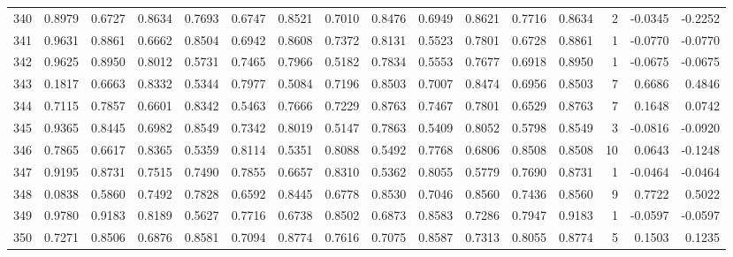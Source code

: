 \begin{tabular}{lrrrrrrrrrrrrrrr}
340 &      0.8979 &  0.6727 &  0.8634 &  0.7693 &  0.6747 &  0.8521 &  0.7010 &  0.8476 &  0.6949 &  0.8621 &   0.7716 &     0.8634 &      2 &                   -0.0345 &                    -0.2252 \\
341 &      0.9631 &  0.8861 &  0.6662 &  0.8504 &  0.6942 &  0.8608 &  0.7372 &  0.8131 &  0.5523 &  0.7801 &   0.6728 &     0.8861 &      1 &                   -0.0770 &                    -0.0770 \\
342 &      0.9625 &  0.8950 &  0.8012 &  0.5731 &  0.7465 &  0.7966 &  0.5182 &  0.7834 &  0.5553 &  0.7677 &   0.6918 &     0.8950 &      1 &                   -0.0675 &                    -0.0675 \\
343 &      0.1817 &  0.6663 &  0.8332 &  0.5344 &  0.7977 &  0.5084 &  0.7196 &  0.8503 &  0.7007 &  0.8474 &   0.6956 &     0.8503 &      7 &                    0.6686 &                     0.4846 \\
344 &      0.7115 &  0.7857 &  0.6601 &  0.8342 &  0.5463 &  0.7666 &  0.7229 &  0.8763 &  0.7467 &  0.7801 &   0.6529 &     0.8763 &      7 &                    0.1648 &                     0.0742 \\
345 &      0.9365 &  0.8445 &  0.6982 &  0.8549 &  0.7342 &  0.8019 &  0.5147 &  0.7863 &  0.5409 &  0.8052 &   0.5798 &     0.8549 &      3 &                   -0.0816 &                    -0.0920 \\
346 &      0.7865 &  0.6617 &  0.8365 &  0.5359 &  0.8114 &  0.5351 &  0.8088 &  0.5492 &  0.7768 &  0.6806 &   0.8508 &     0.8508 &     10 &                    0.0643 &                    -0.1248 \\
347 &      0.9195 &  0.8731 &  0.7515 &  0.7490 &  0.7855 &  0.6657 &  0.8310 &  0.5362 &  0.8055 &  0.5779 &   0.7690 &     0.8731 &      1 &                   -0.0464 &                    -0.0464 \\
348 &      0.0838 &  0.5860 &  0.7492 &  0.7828 &  0.6592 &  0.8445 &  0.6778 &  0.8530 &  0.7046 &  0.8560 &   0.7436 &     0.8560 &      9 &                    0.7722 &                     0.5022 \\
349 &      0.9780 &  0.9183 &  0.8189 &  0.5627 &  0.7716 &  0.6738 &  0.8502 &  0.6873 &  0.8583 &  0.7286 &   0.7947 &     0.9183 &      1 &                   -0.0597 &                    -0.0597 \\
350 &      0.7271 &  0.8506 &  0.6876 &  0.8581 &  0.7094 &  0.8774 &  0.7616 &  0.7075 &  0.8587 &  0.7313 &   0.8055 &     0.8774 &      5 &                    0.1503 &                     0.1235 \\

\end{tabular}
